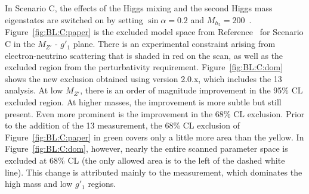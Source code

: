 In Scenario C, the effects of the Higgs mixing and the second Higgs mass eigenstates are switched on by setting $\sin\alpha=0.2$ and $M_{h_2}=200$~\GeV{}. Figure~\ref{fig:BL:C:paper} is the excluded model space from Reference~\cite{BLcontur} for Scenario C in the $M_{Z'}$ - $g'_1$ plane. There is an experimental constraint arising from electron-neutrino scattering that is shaded in red on the scan, as well as the excluded region from the perturbativity requirement. Figure~\ref{fig:BL:C:dom} shows the new exclusion obtained using \contur version 2.0.x, which includes the \unit{13}{\TeV} \mFourL{} analysis. At low $M_{Z'}$, there is an order of magnitude improvement in the 95\% CL excluded region. At higher masses, the improvement is more subtle but still present. Even more prominent is the improvement in the 68\% CL exclusion. Prior to the addition of the \unit{13}{\TeV} \mFourL{} measurement, the 68\% CL exclusion of Figure~\ref{fig:BL:C:paper} in green covers only a little more area than the yellow. In Figure~\ref{fig:BL:C:dom}, however, nearly the entire scanned parameter space is excluded at 68\% CL (the only allowed area is to the left of the dashed white line). This change is attributed mainly to the \mFourL{} measurement, which dominates the high mass and low $g'_1$ regions. 

